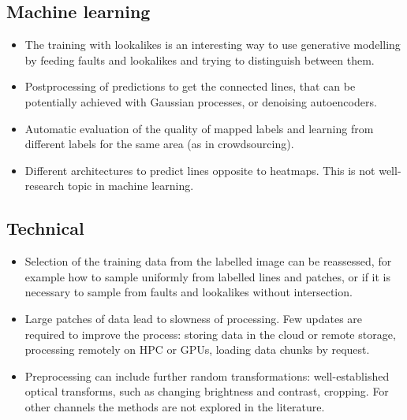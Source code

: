 \documentclass[11pt,a4paper]{article}
\begin{document}
\subsection{Machine learning}
    \begin{itemize}
        \item The training with lookalikes is an interesting way to use generative modelling by feeding faults and lookalikes and trying to
            distinguish between them.
        \item Postprocessing of predictions to get the connected lines, that can be potentially achieved with Gaussian processes,
            or denoising autoencoders.
        \item Automatic evaluation of the quality of mapped labels and learning from different labels for the same area (as in
            crowdsourcing).
        \item Different architectures to predict lines opposite to heatmaps. This is not well-research topic in machine learning.
    \end{itemize}
\subsection{Technical}
    \begin{itemize}
        \item Selection of the training data from the labelled image can be reassessed, for example how to sample
            uniformly from labelled lines and patches, or if it is necessary to sample from faults and lookalikes without
            intersection.
        \item Large patches of data lead to slowness of processing. Few updates are required to improve the process: storing data in the cloud or remote storage, processing remotely on HPC or GPUs, loading data chunks by request.
        \item Preprocessing can include further random transformations: well-established optical transforms, such as changing
            brightness and contrast, cropping. For other channels the methods are not explored in the literature.
    \end{itemize}
\end{document}
